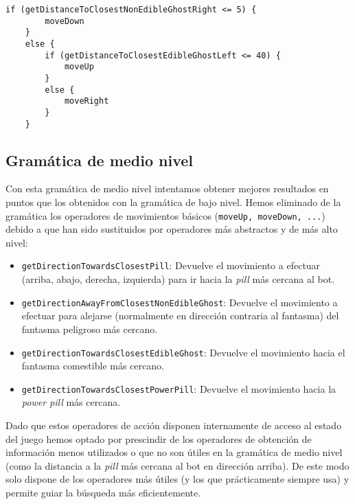 \begin{lstlisting}[caption={Mejor individuo producido usando la gramática de bajo nivel evolucionado jugando contra Legacy Ghosts.}]
    if (getDistanceToClosestNonEdibleGhostRight <= 5) {
        moveDown
    }
    else {
        if (getDistanceToClosestEdibleGhostLeft <= 40) {
            moveUp
        }
        else {
            moveRight
        }
    }
\end{lstlisting}

\subsection{Gramática de medio nivel}
Con esta gramática de medio nivel intentamos obtener mejores resultados en puntos que los obtenidos con la gramática de bajo nivel. Hemos eliminado de la gramática los operadores de movimientos básicos (\texttt{moveUp, moveDown, ...}) debido a que han sido sustituidos por operadores más abstractos y de más alto nivel:
\begin{itemize}
\item \texttt{getDirectionTowardsClosestPill}: Devuelve el movimiento a efectuar (arriba, abajo, derecha, izquierda) para ir hacia la \textit{pill} más cercana al bot.

\item \texttt{getDirectionAwayFromClosestNonEdibleGhost}: Devuelve el movimiento a efectuar para alejarse (normalmente en dirección contraria al fantasma) del fantasma peligroso más cercano.

\item \texttt{getDirectionTowardsClosestEdibleGhost}: Devuelve el movimiento hacia el fantasma comestible más cercano.

\item \texttt{getDirectionTowardsClosestPowerPill}: Devuelve el movimiento hacia la \textit{power pill} más cercana.
\end{itemize}

Dado que estos operadores de acción disponen internamente de acceso al estado del juego hemos optado por prescindir de los operadores de obtención de información menos utilizados o que no son útiles en la gramática de medio nivel (como la distancia a la \textit{pill} más cercana al bot en dirección arriba). De este modo solo dispone de los operadores más útiles (y los que prácticamente siempre usa) y permite guiar la búsqueda más eficientemente.

